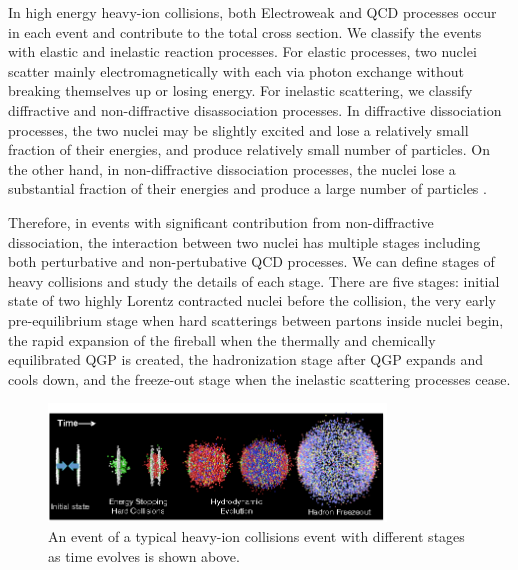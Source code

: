 In high energy heavy-ion collisions, both Electroweak and QCD processes occur in each event and contribute to the total cross section. We classify the events with elastic and inelastic reaction processes. For elastic processes, two nuclei scatter mainly electromagnetically with each via photon exchange without breaking themselves up or losing energy. For inelastic scattering, we classify diffractive and non-diffractive disassociation processes. In diffractive dissociation processes, the two nuclei may be slightly excited and lose a relatively small fraction of their energies, and produce relatively small number of particles. On the other hand, in non-diffractive dissociation processes, the nuclei lose a substantial fraction of their energies and produce a large number of particles \cite{CYWong}. 

Therefore, in events with significant contribution from non-diffractive dissociation, the interaction between two nuclei has multiple stages including both perturbative and non-pertubative QCD processes. We can define stages of heavy collisions and study the details of each stage. There are five stages: initial state of two highly Lorentz contracted nuclei before the collision, the very early pre-equilibrium stage when hard scatterings between partons inside nuclei begin, the rapid expansion of the fireball when the thermally and chemically equilibrated QGP is created, the hadronization stage after QGP expands and cools down, and the freeze-out stage when the inelastic scattering processes cease.


\begin{figure}[hbtp]
\begin{center}
\includegraphics[width=0.80\textwidth]{Figures/Chapter1/Heavy-Ion-Process.png}
\caption{An event of a typical heavy-ion collisions event with different stages as time evolves is shown above.}
\label{HeavyIonStages}
\end{center}
\end{figure} 

